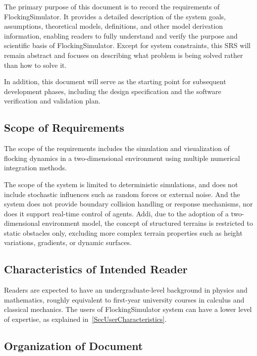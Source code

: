 \documentclass[12pt]{article}
\begin{document}
The primary purpose of this document is to record the requirements of 
FlockingSimulator. It provides a detailed description of the system goals, 
assumptions, theoretical models, definitions, and other model derivation 
information, enabling readers to fully understand and verify the purpose and 
scientific basis of FlockingSimulator. Except for system constraints, this SRS 
will remain abstract and focuses on describing what problem is being solved 
rather than how to solve it.

In addition, this document will serve as the starting point for subsequent 
development phases, including the design specification and the software 
verification and validation plan.

\subsection{Scope of Requirements} 

The scope of the requirements includes the simulation and visualization of 
flocking dynamics in a two-dimensional environment using multiple numerical 
integration methods. 

The scope of the system is limited to deterministic simulations, and does not 
include stochastic influences such as random forces or external noise. And the 
system does not provide boundary collision handling or response mechanisms, nor 
does it support real-time control of agents. Addi, due to the adoption of a 
two-dimensional environment model, the concept of structured terrains is 
restricted to static obstacles only, excluding more complex terrain properties 
such as height variations, gradients, or dynamic surfaces.

\subsection{Characteristics of Intended Reader} \label{sec_IntendedReader}

Readers are expected to have an undergraduate-level background in physics and 
mathematics, roughly equivalent to first-year university courses in calculus 
and classical mechanics. The users of FlockingSimulator system can have a lower 
level of expertise, as explained in~\ref{SecUserCharacteristics}.

\subsection{Organization of Document}
\end{document}
